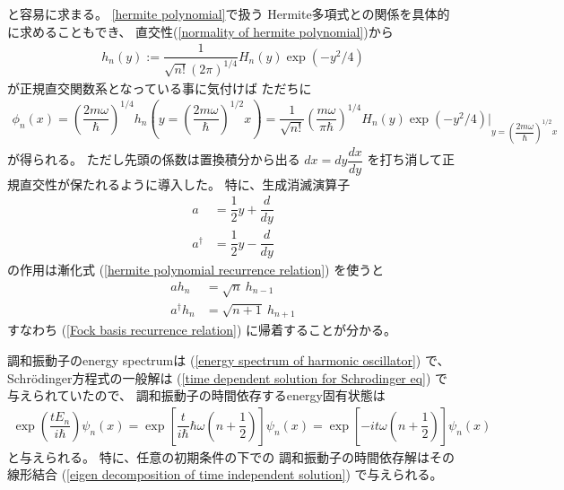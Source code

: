 と容易に求まる。
\ref{hermite polynomial}で扱う
Hermite多項式との関係を具体的に求めることもでき、
直交性(\ref{normality of hermite polynomial})から
\begin{align}
    h_n(y)
    :=
    \dfrac{1}{ \sqrt{n!} (2\pi)^{1/4}}
    H_n(y) \exp(- y^2 / 4)
\end{align}
が正規直交関数系となっている事に気付けば
ただちに
\begin{align}
    \phi_n(x)
    =
    \left(
            \dfrac{2 m \omega}{\hbar}
    \right)^{1/4}
    h_n
    \left(
        y =
        \left(
            \dfrac{2 m \omega}{\hbar}
        \right)^{1/2} x
    \right)
    =
    \dfrac{1}{ \sqrt{n!} }
    \left(
            \dfrac{m \omega}{\pi \hbar}
    \right)^{1/4}
    H_n(y) \exp(- y^2 / 4)
    \bigg|_{
        \displaystyle
        y =
        \left(
            \dfrac{2 m \omega}{\hbar}
        \right)^{1/2}
        x
    }
\end{align}
が得られる。
ただし先頭の係数は置換積分から出る
$dx = dy \dfrac{dx}{dy}$
を打ち消して正規直交性が保たれるように導入した。
特に、生成消滅演算子
\begin{subequations}
\begin{align}
    a
    &=
    \dfrac{1}{2}
    y
    +
    \dfrac{d}{dy}
\\
    a^\dagger
    &=
    \dfrac{1}{2}
    y
    -
    \dfrac{d}{dy}
\end{align}
\end{subequations}
の作用は漸化式
(\ref{hermite polynomial recurrence relation})
を使うと
\begin{align}
    a h_n &= \sqrt{n}\ h_{n-1}
\\
    a^\dagger h_n
    &= \sqrt{n + 1}\ h_{n+1}
\end{align}
すなわち
(\ref{Fock basis recurrence relation})
に帰着することが分かる。

調和振動子のenergy spectrumは
(\ref{energy spectrum of harmonic oscillator})
で、
Schr\"odinger方程式の一般解は
(\ref{time dependent solution for Schrodinger eq})
で与えられていたので、
調和振動子の時間依存するenergy固有状態は
\begin{align}
    \exp( \dfrac{t E_n}{i\hbar} )
    \psi_n (x)
    =
    \exp\left[
        \dfrac{t}{i\hbar}
        \hbar \omega
        \left( n + \dfrac{1}{2} \right)
    \right]
    \psi_n (x)
    =
    \exp\left[
        - i t \omega
        \left( n + \dfrac{1}{2} \right)
    \right]
    \psi_n (x)
\end{align}
と与えられる。
特に、任意の初期条件の下での
調和振動子の時間依存解はその線形結合
(\ref{eigen decomposition of time independent solution})
で与えられる。

